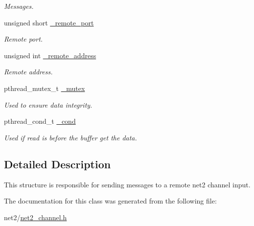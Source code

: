 \begin{DoxyCompactItemize}
\begin{DoxyCompactList}\small\item\em Messages. \end{DoxyCompactList}\item 
\hypertarget{structnet2__channel__output__t_a7236b85d69d9c17a6d11d830c191096a}{unsigned short \hyperlink{structnet2__channel__output__t_a7236b85d69d9c17a6d11d830c191096a}{\-\_\-remote\-\_\-port}}\label{structnet2__channel__output__t_a7236b85d69d9c17a6d11d830c191096a}

\begin{DoxyCompactList}\small\item\em Remote port. \end{DoxyCompactList}\item 
\hypertarget{structnet2__channel__output__t_aed3ee28ef3dd928ad8735a44187e6016}{unsigned int \hyperlink{structnet2__channel__output__t_aed3ee28ef3dd928ad8735a44187e6016}{\-\_\-remote\-\_\-address}}\label{structnet2__channel__output__t_aed3ee28ef3dd928ad8735a44187e6016}

\begin{DoxyCompactList}\small\item\em Remote address. \end{DoxyCompactList}\item 
\hypertarget{structnet2__channel__output__t_a440374b4242121a1dafbe2f457264b15}{pthread\-\_\-mutex\-\_\-t \hyperlink{structnet2__channel__output__t_a440374b4242121a1dafbe2f457264b15}{\-\_\-mutex}}\label{structnet2__channel__output__t_a440374b4242121a1dafbe2f457264b15}

\begin{DoxyCompactList}\small\item\em Used to ensure data integrity. \end{DoxyCompactList}\item 
\hypertarget{structnet2__channel__output__t_ab87a0f05e9a6580b15fb5e9fc21e2142}{pthread\-\_\-cond\-\_\-t \hyperlink{structnet2__channel__output__t_ab87a0f05e9a6580b15fb5e9fc21e2142}{\-\_\-cond}}\label{structnet2__channel__output__t_ab87a0f05e9a6580b15fb5e9fc21e2142}

\begin{DoxyCompactList}\small\item\em Used if read is before the buffer get the data. \end{DoxyCompactList}\end{DoxyCompactItemize}


\subsection{Detailed Description}
This structure is responsible for sending messages to a remote net2 channel input. 

The documentation for this class was generated from the following file\-:\begin{DoxyCompactItemize}
\item 
net2/\hyperlink{net2__channel_8h}{net2\-\_\-channel.\-h}\end{DoxyCompactItemize}
